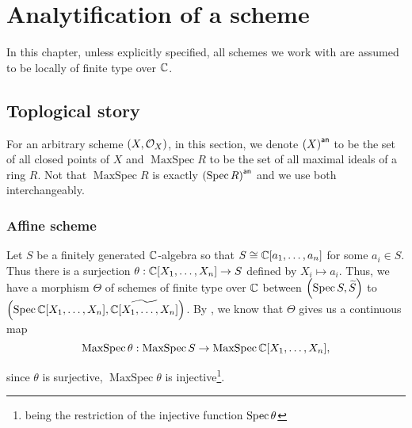 
\chapter{Analytification of a scheme}

In this chapter, unless explicitly specified, all schemes we work with are assumed to be locally of finite type over $\mathbb{C}$.

\section{Toplogical story}


For an arbitrary scheme $\left(X, \mathcal{O}_{X}\right)$, in this section, we denote $\left({X}\right)^{\mathsf{an}}$ to be the set of all closed points of $X$ and $\operatorname{MaxSpec} R$ to be the set of all maximal ideals of a ring $R$. Not that $\operatorname{MaxSpec} R$ is exactly $\left({\operatorname{Spec}{R}}\right)^{\mathsf{an}}$ and we use both interchangeably.

\subsection{Affine scheme}



Let $S$ be a finitely generated $\mathbb{C}$-algebra so that $S \cong \mathbb{C}[a_{1},\dots, a_{n}]$ for some $a_{i} \in S$. Thus there is a surjection $\theta: \mathbb{C}[X_{1}, \dots, X_{n}] \to S$ defined by $X_{i} \mapsto a_{i}$. Thus, we have a morphism $\Theta$ of schemes of finite type over $\mathbb{C}$ between $\left(\operatorname*{Spec}{S}, \widetilde{S}\right)$ to $\left(\operatorname*{Spec}{\mathbb{C}[X_{1},\dots, X_{n}]}, \widetilde{\mathbb{C}[X_{1},\dots, X_{n}]}\right)$. By , we know that $\Theta$ gives us a continuous map
\[
\operatorname{MaxSpec}\theta: \operatorname{MaxSpec} S \to \operatorname{MaxSpec} \mathbb{C}[X_{1},\dots, X_{n}],
\]

since $\theta$ is surjective, $\operatorname{MaxSpec}\theta$ is injective\footnote{being the restriction of the injective function $\operatorname{Spec} \theta$}.

